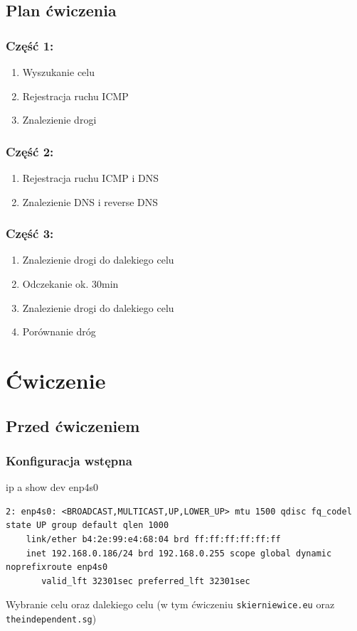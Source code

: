 \documentclass[11pt]{article}
\begin{document}
\subsection{Plan ćwiczenia}
\label{sec:orgf12c468}
\subsubsection{Część 1:}
\label{sec:org58ac94e}
\begin{enumerate}
\item Wyszukanie celu
\item Rejestracja ruchu ICMP
\item Znalezienie drogi
\end{enumerate}
\subsubsection{Część 2:}
\label{sec:orgb3e59e5}
\begin{enumerate}
\item Rejestracja ruchu ICMP i DNS
\item Znalezienie DNS i reverse DNS
\end{enumerate}
\subsubsection{Część 3:}
\label{sec:org85e9f9a}
\begin{enumerate}
\item Znalezienie drogi do dalekiego celu
\item Odczekanie ok. 30min
\item Znalezienie drogi do dalekiego celu
\item Porównanie dróg
\end{enumerate}


\section{Ćwiczenie}
\label{sec:orge11bf3e}
\subsection{Przed ćwiczeniem}
\label{sec:orgbc33336}
\subsubsection{Konfiguracja wstępna}
\label{sec:org3092bb9}
ip a show dev enp4s0
\begin{verbatim}
2: enp4s0: <BROADCAST,MULTICAST,UP,LOWER_UP> mtu 1500 qdisc fq_codel state UP group default qlen 1000
    link/ether b4:2e:99:e4:68:04 brd ff:ff:ff:ff:ff:ff
    inet 192.168.0.186/24 brd 192.168.0.255 scope global dynamic noprefixroute enp4s0
       valid_lft 32301sec preferred_lft 32301sec
\end{verbatim}
Wybranie celu oraz dalekiego celu (w tym ćwiczeniu \texttt{skierniewice.eu} oraz \texttt{theindependent.sg})
\end{document}
